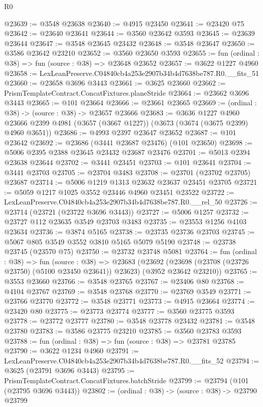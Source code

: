\begin{lexlean}{R0}
\begin{coremodule}
@23639 := @3548 @23638
@23640 := @4915 @23450
@23641 := @23420 @75
@23642 := @23640 @23641
@23644 := @3560 @23642 @3593
@23645 := @23639 @23644
@23647 := @3548 @23645 @23432
@23648 := @3548 @23647
@23650 := @3586 @23642 @23210
@23652 := @3560 @23650 @3593
@23655 := fun (ordinal : @38) => fun (source : @38) => @23648 @23652
@23657 := @3622 @1227 @4960
@23658 := LexLeanPreserve.C04840cb4a253e2907b34b4d7638be787.R0.__fits_51
@23660 := @23658 @3696 @3443
@23661 := @3625 @23660
@23662 := PrismTemplateContract.ConcatFixtures.planeStride
@23664 := @23662 @3696 @3443
@23665 := @101 @23664
@23666 := @23661 @23665
@23669 := (ordinal : @38) -> (source : @38) -> @23657 @23666
@23683 := @3636
    @1227
    @4960
    @23666
    @2399
    @4981
    (@3657 (@3667 @1227))
    (@3673 (@3674 (@3675 @2399) @4960 @3651))
@23686 := @4993 @2397 @23647 @23652
@23687 := @101 @23642
@23692 := @23686 (@3441 @23687 @23476) (@101 @23650)
@23698 := @5006 @2395 @2388 @23645 @23432 @23687 @23476
@23701 := @5013 @2394 @23638 @23644
@23702 := @3441 @23451
@23703 := @101 @23641
@23704 := @3441 @23703
@23705 := @23704 @3483
@23708 := @23701 (@23702 @23705) @23687
@23714 := @5006 @1219 @1313 @23632 @23637 @23451 @23705
@23721 := @5059 @1217 @1025 @3552 @23446 @4960 @23451 @23522
@23722 := LexLeanPreserve.C04840cb4a253e2907b34b4d7638be787.R0.__rel_50
@23726 := @23714 (@23721 (@23722 @3696 @3443))
@23727 := @5006 @1257
@23732 := @23727 @112 @23635 @3549 @23703 @3483
@23735 := @23553 @1256 @4103 @23634
@23736 := @3874 @5165
@23738 := @23735 @23736 @23703
@23745 := @5067 @805 @3549 @3552 @3810 @5165 @5079 @5190
@23748 := @23738 @23745 (@23570 @75)
@23750 := @23732 @23748 @5081
@23764 := fun (ordinal : @38) =>
  fun (source : @38) =>
  @23683
    (@23692 (@23698 (@23708 (@23726 @23750) (@5100 @23450 @23641)) @23623) (@3952 @23642 @23210))
@23765 := @3553 @23660
@23766 := @3548 @23765
@23767 := @23406 @80
@23768 := @4104 @23767
@23769 := @3548 @23768
@23770 := @23769 @3549
@23771 := @23766 @23770
@23772 := @3548 @23771
@23773 := @4915 @23664
@23774 := @23420 @80
@23775 := @23773 @23774
@23777 := @3560 @23775 @3593
@23778 := @23772 @23777
@23780 := @3548 @23778 @23432
@23781 := @3548 @23780
@23783 := @3586 @23775 @23210
@23785 := @3560 @23783 @3593
@23788 := fun (ordinal : @38) => fun (source : @38) => @23781 @23785
@23790 := @3622 @1234 @4960
@23791 := LexLeanPreserve.C04840cb4a253e2907b34b4d7638be787.R0.__fits_52
@23794 := @3625 (@23791 @3696 @3443)
@23795 := PrismTemplateContract.ConcatFixtures.batchStride
@23799 := @23794 (@101 (@23795 @3696 @3443))
@23802 := (ordinal : @38) -> (source : @38) -> @23790 @23799

\end{coremodule}
\end{lexlean}
